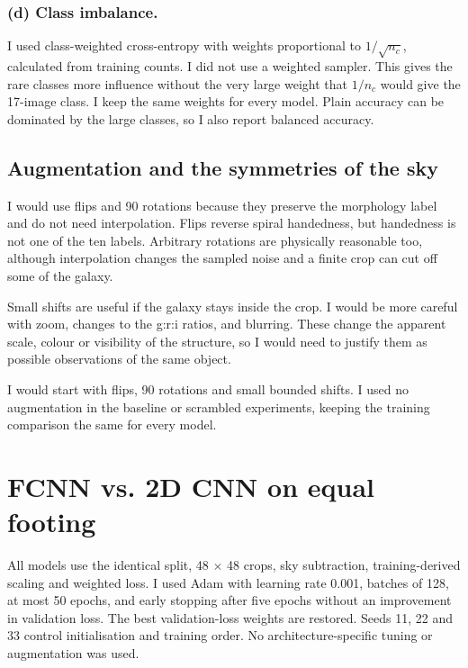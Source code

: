 \documentclass[11pt]{article}
\begin{document}
\subsubsection*{(d) Class imbalance.}

I used class-weighted cross-entropy with weights proportional to $1/\sqrt{n_c}$, calculated from training counts. I did not use a weighted sampler. This gives the rare classes more influence without the very large weight that $1/n_c$ would give the 17-image class. I keep the same weights for every model. Plain accuracy can be dominated by the large classes, so I also report balanced accuracy.

\subsection{Augmentation and the symmetries of the sky}

I would use flips and 90\textdegree{} rotations because they preserve the morphology label and do not need interpolation. Flips reverse spiral handedness, but handedness is not one of the ten labels. Arbitrary rotations are physically reasonable too, although interpolation changes the sampled noise and a finite crop can cut off some of the galaxy.

Small shifts are useful if the galaxy stays inside the crop. I would be more careful with zoom, changes to the g:r:i ratios, and blurring. These change the apparent scale, colour or visibility of the structure, so I would need to justify them as possible observations of the same object.

I would start with flips, 90\textdegree{} rotations and small bounded shifts. I used no augmentation in the baseline or scrambled experiments, keeping the training comparison the same for every model.

\section{FCNN vs. 2D CNN on equal footing}

All models use the identical split, 48 \ensuremath{\times} 48 crops, sky subtraction, training-derived scaling and weighted loss. I used Adam with learning rate 0.001, batches of 128, at most 50 epochs, and early stopping after five epochs without an improvement in validation loss. The best validation-loss weights are restored. Seeds 11, 22 and 33 control initialisation and training order. No architecture-specific tuning or augmentation was used.
\end{document}
